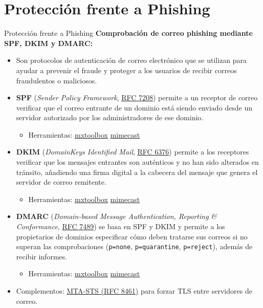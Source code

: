 \documentclass[aspectratio=169,11pt]{beamer}
\newcommand{\cmd}[1]{\texttt{\color{uznavy}#1}}
\newcommand{\lead}[1]{{\color{uznavy}\bfseries #1}\par\smallskip}
\begin{document}
\section{Protección frente a Phishing}

\begin{frame}[allowframebreaks]{Protección frente a Phishing}
\small
\lead{Comprobación de correo phishing mediante SPF, DKIM y DMARC:}
  \begin{itemize}
  \item Son protocolos de autenticación de correo electrónico que se utilizan para ayudar a prevenir el fraude y proteger a los usuarios de recibir correos fraudulentos o maliciosos.
  \item \textbf{SPF} (\emph{Sender Policy Framework}, \href{https://www.rfc-editor.org/rfc/rfc7208}{RFC 7208}) permite a un receptor de correo verificar que el correo entrante de un dominio está siendo enviado desde un servidor autorizado por los administradores de ese dominio.
    \begin{itemize}
    \item Herramientas: \href{https://mxtoolbox.com/spf.aspx}{mxtoolbox} \textbar{} \href{https://www.mimecast.com/products/dmarc-analyzer/spf-record-check/}{mimecast}
    \end{itemize}
  \item \textbf{DKIM} (\emph{DomainKeys Identified Mail}, \href{https://www.rfc-editor.org/rfc/rfc6376}{RFC 6376}) permite a los receptores verificar que los mensajes entrantes son auténticos y no han sido alterados en tránsito, añadiendo una firma digital a la cabecera del mensaje que genera el servidor de correo remitente.
    \begin{itemize}
    \item Herramientas: \href{https://mxtoolbox.com/dkim.aspx}{mxtoolbox} \textbar{} \href{https://www.mimecast.com/products/dmarc-analyzer/dkim-check/}{mimecast}
    \end{itemize}
  \item \textbf{DMARC} (\emph{Domain-based Message Authentication, Reporting \& Conformance}, \href{https://www.rfc-editor.org/rfc/rfc7489}{RFC 7489}) se basa en SPF y DKIM y permite a los propietarios de dominios especificar cómo deben tratarse sus correos si no superan las comprobaciones (\cmd{p=none}, \cmd{p=quarantine}, \cmd{p=reject}), además de recibir informes.
    \begin{itemize}
    \item Herramientas: \href{https://mxtoolbox.com/dmarc.aspx}{mxtoolbox} \textbar{} \href{https://www.mimecast.com/products/dmarc-analyzer/dmarc-check/}{mimecast}
    \end{itemize}
  \item Complementos: \href{https://www.rfc-editor.org/rfc/rfc8461}{MTA-STS (RFC 8461)} para forzar TLS entre servidores de correo.
  \end{itemize}
\end{frame}
\end{document}
